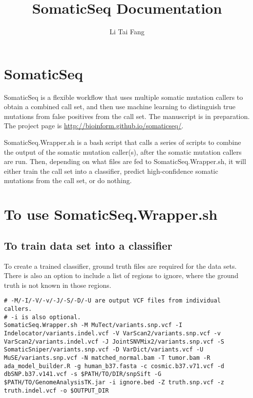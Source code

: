 \documentclass[10pt,letterpaper]{article}
\author{Li Tai Fang}
\title{SomaticSeq Documentation}
\begin{document}
\maketitle



\begin{sloppypar}




\section{SomaticSeq}

SomaticSeq is a flexible workflow that uses multiple somatic mutation callers to obtain a combined call set, and then use machine learning to distinguish true mutations from false positives from the call set. The manuscript is in preparation. The project page is \href{http://bioinform.github.io/somaticseq/}{http://bioinform.github.io/somaticseq/}. 

SomaticSeq.Wrapper.sh is a bash script that calls a series of scripts to combine the output of the somatic mutation caller(s), after the somatic mutation callers are run. Then, depending on what files are fed to SomaticSeq.Wrapper.sh, it will either train the call set into a classifier, predict high-confidence somatic mutations from the call set, or do nothing. 



\section{To use SomaticSeq.Wrapper.sh}

\subsection{To train data set into a classifier}

To create a trained classifier, ground truth files are required for the data sets. There is also an option to include a list of regions to ignore, where the ground truth is not known in those regions. 

\begin{lstlisting}
# -M/-I/-V/-v/-J/-S/-D/-U are output VCF files from individual callers.
# -i is also optional.
SomaticSeq.Wrapper.sh -M MuTect/variants.snp.vcf -I Indelocator/variants.indel.vcf -V VarScan2/variants.snp.vcf -v VarScan2/variants.indel.vcf -J JointSNVMix2/variants.snp.vcf -S SomaticSniper/variants.snp.vcf -D VarDict/variants.vcf -U MuSE/variants.snp.vcf -N matched_normal.bam -T tumor.bam -R ada_model_builder.R -g human_b37.fasta -c cosmic.b37.v71.vcf -d dbSNP.b37.v141.vcf -s $PATH/TO/DIR/snpSift -G $PATH/TO/GenomeAnalysisTK.jar -i ignore.bed -Z truth.snp.vcf -z truth.indel.vcf -o $OUTPUT_DIR
\end{lstlisting}


\end{sloppypar}
\end{document}
